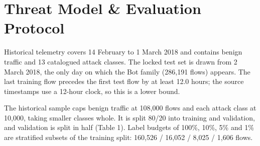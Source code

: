 \documentclass[10pt,a4paper]{article}
\begin{document}
\section{Threat Model \& Evaluation Protocol}
Historical telemetry covers 14 February to 1 March 2018 and contains benign traffic and 13 catalogued attack classes. The locked test set is drawn from 2 March 2018, the only day on which the Bot family (286,191 flows) appears. The last training flow precedes the first test flow by at least 12.0 hours; the source timestamps use a 12-hour clock, so this is a lower bound.

The historical sample caps benign traffic at 108,000 flows and each attack class at 10,000, taking smaller classes whole. It is split 80/20 into training and validation, and validation is split in half (Table 1). Label budgets of 100\%, 10\%, 5\% and 1\% are stratified subsets of the training split: 160,526 / 16,052 / 8,025 / 1,606 flows.
\end{document}
